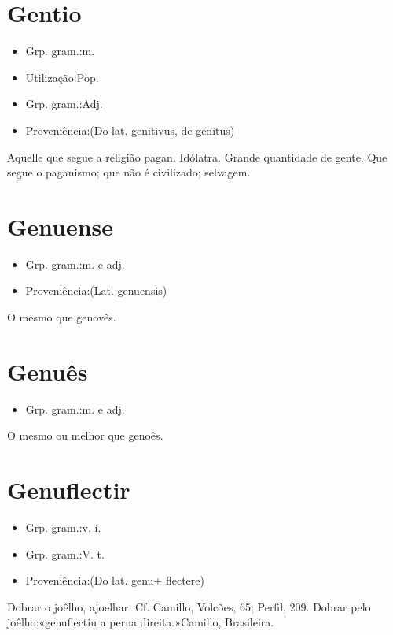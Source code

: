 \section{Gentio}
\begin{itemize}
\item {Grp. gram.:m.}
\end{itemize}
\begin{itemize}
\item {Utilização:Pop.}
\end{itemize}
\begin{itemize}
\item {Grp. gram.:Adj.}
\end{itemize}
\begin{itemize}
\item {Proveniência:(Do lat. \textunderscore genitivus\textunderscore , de \textunderscore genitus\textunderscore )}
\end{itemize}
Aquelle que segue a religião pagan.
Idólatra.
Grande quantidade de gente.
Que segue o paganismo; que não é civilizado; selvagem.
\section{Genuense}
\begin{itemize}
\item {Grp. gram.:m.  e  adj.}
\end{itemize}
\begin{itemize}
\item {Proveniência:(Lat. \textunderscore genuensis\textunderscore )}
\end{itemize}
O mesmo que \textunderscore genovês\textunderscore .
\section{Genuês}
\begin{itemize}
\item {Grp. gram.:m.  e  adj.}
\end{itemize}
O mesmo ou melhor que \textunderscore genoês\textunderscore .
\section{Genuflectir}
\begin{itemize}
\item {Grp. gram.:v. i.}
\end{itemize}
\begin{itemize}
\item {Grp. gram.:V. t.}
\end{itemize}
\begin{itemize}
\item {Proveniência:(Do lat. \textunderscore genu\textunderscore  + \textunderscore flectere\textunderscore )}
\end{itemize}
Dobrar o joêlho, ajoelhar. Cf. Camillo, \textunderscore Volcões\textunderscore , 65; \textunderscore Perfil\textunderscore , 209.
Dobrar pelo joêlho:«\textunderscore genuflectiu a perna direita.\textunderscore »Camillo, \textunderscore Brasileira\textunderscore .
